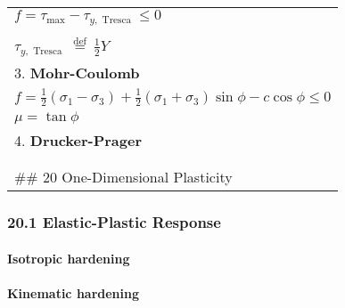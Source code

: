 \begin{longtable}[]{@{}l@{}}
\begin{minipage}[t]{0.47\columnwidth}
\(f = \tau_{\max } -\tau_{y, \text { Tresca }} \leq 0\)\strut
\end{minipage}\tabularnewline
\begin{minipage}[t]{0.47\columnwidth}\raggedright
\(\tau_{\max } \stackrel{\text { def }}{=} \frac{1}{2}\left(\sigma_{1}-\sigma_{3}\right) \geq 0\)\\
\(\tau_{y, \text { Tresca }} \stackrel{\text { def }}{=} \frac{1}{2} Y\)\strut
\end{minipage}\tabularnewline
\begin{minipage}[t]{0.47\columnwidth}\raggedright
3. \textbf{Mohr-Coulomb}\strut
\end{minipage}\tabularnewline
\begin{minipage}[t]{0.47\columnwidth}\raggedright
\(f = \frac{1}{2}\left(\sigma_{1}-\sigma_{3}\right)+\frac{1}{2}\left(\sigma_{1}+\sigma_{3}\right) \sin \phi-c \cos \phi \leq 0\)\strut
\end{minipage}\tabularnewline
\begin{minipage}[t]{0.47\columnwidth}\raggedright
\(\mu=\tan \phi\)\strut
\end{minipage}\tabularnewline
\begin{minipage}[t]{0.47\columnwidth}\raggedright
4. \textbf{Drucker-Prager}\strut
\end{minipage}\tabularnewline
\begin{minipage}[t]{0.47\columnwidth}\raggedright
\(f(\bar{\tau}, \bar{p}, S)=\bar{\tau}-(S+\alpha \bar{p})\leq 0 \\\)\strut
\end{minipage}\tabularnewline
\begin{minipage}[t]{0.47\columnwidth}\raggedright
\#\# 20 One-Dimensional Plasticity\strut
\end{minipage}\tabularnewline
\bottomrule
\end{longtable}

\hypertarget{elastic-plastic-response}{%
\subsubsection{20.1 Elastic-Plastic
Response}\label{elastic-plastic-response}}

\hypertarget{isotropic-hardening}{%
\paragraph{Isotropic hardening}\label{isotropic-hardening}}

\hypertarget{kinematic-hardening}{%
\paragraph{Kinematic hardening}\label{kinematic-hardening}}

